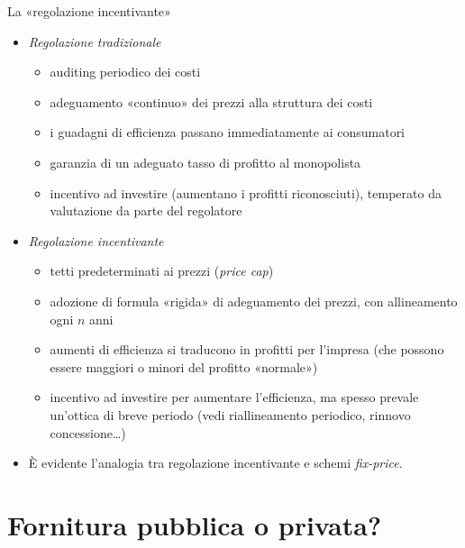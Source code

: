 \documentclass[aspectratio=64,12pt]{beamer}
\begin{document}
\begin{frame}{La «regolazione incentivante»}
\begin{itemize}
\item \emph{Regolazione tradizionale}
\begin{itemize}
\item auditing periodico dei costi
\item adeguamento «continuo» dei prezzi alla struttura dei costi
\item i guadagni di efficienza passano immediatamente ai consumatori
\item garanzia di un adeguato tasso di profitto al monopolista
\item incentivo ad investire (aumentano i profitti riconosciuti), temperato da
valutazione da parte del regolatore
\end{itemize}
\item \emph{Regolazione incentivante}
\begin{itemize}
\item tetti predeterminati ai prezzi (\emph{price cap})
\item adozione di formula «rigida» di adeguamento dei prezzi, con allineamento
ogni $n$ anni
\item aumenti di efficienza si traducono in profitti per l'impresa (che possono
essere maggiori o minori del profitto «normale»)
\item incentivo ad investire per aumentare l'efficienza, ma spesso prevale
un'ottica di breve periodo (vedi riallineamento periodico, rinnovo
concessione\ldots{})
\end{itemize}
\item È evidente l'analogia tra regolazione incentivante e schemi \emph{fix-price}.
\end{itemize}
\end{frame}

\section{Fornitura pubblica o privata?}
\end{document}
